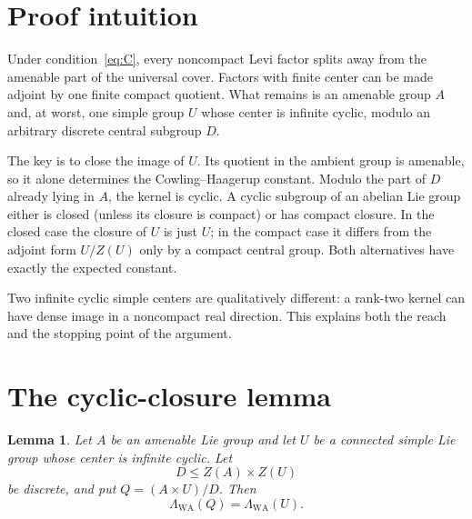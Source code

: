 \documentclass[11pt]{article}
\newtheorem{lemma}[theorem]{Lemma}
\newcommand{\WA}{\mathrm{WA}}
\begin{document}
\section{Proof intuition}

Under condition~\eqref{eq:C}, every noncompact Levi factor splits away from
the amenable part of the universal cover.  Factors with finite center can be
made adjoint by one finite compact quotient.  What remains is an amenable
group $A$ and, at worst, one simple group $U$ whose center is infinite
cyclic, modulo an arbitrary discrete central subgroup $D$.

The key is to close the image of $U$.  Its quotient in the ambient group is
amenable, so it alone determines the Cowling--Haagerup constant.  Modulo the
part of $D$ already lying in $A$, the kernel is cyclic.  A cyclic subgroup
of an abelian Lie group either is closed (unless its closure is compact) or
has compact closure.  In the closed case the closure of $U$ is just $U$;
in the compact case it differs from the adjoint form $U/Z(U)$ only by a
compact central group.  Both alternatives have exactly the expected
constant.

Two infinite cyclic simple centers are qualitatively different: a
rank-two kernel can have dense image in a noncompact real direction.  This
explains both the reach and the stopping point of the argument.

\section{The cyclic-closure lemma}

\begin{lemma}\label{lem:cyclic}
Let $A$ be an amenable Lie group and let $U$ be a connected simple Lie group
whose center is infinite cyclic.  Let
\[
 D\leq Z(A)\times Z(U)
\]
be discrete, and put $Q=(A\times U)/D$.  Then
\[
 \Lambda_{\WA}(Q)=\Lambda_{\WA}(U).
\]
\end{lemma}
\end{document}
